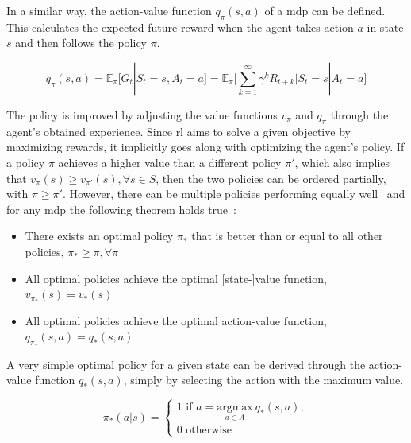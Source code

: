 \documentclass[draft,final]{vutinfth} %
\newcommand{\p}[1]{see p. #1}
\begin{document}
    In a similar way, the action-value function $q_\pi(s,a)$ of a \gls{mdp} can be defined.
    This calculates the expected future reward when the agent takes action $a$ in state $s$ and then follows the policy $\pi$.

    \begin{equation}
        q_\pi(s,a) = \mathbb{E}_\pi[G_t|S_t = s, A_t = a] = \mathbb{E}_\pi \Bigg[\sum_{k=1}^{\infty} \gamma^k R_{t+k} \bigg| S_t = s | A_t = a \Bigg]\label{eq:quality_function}
    \end{equation}

    The policy is improved by adjusting the value functions $v_\pi$ and $q_\pi$ through the agent's obtained experience.
    Since \gls{rl} aims to solve a given objective by maximizing rewards, it implicitly goes along with optimizing the agent's policy.
    If a policy $\pi$ achieves a higher value than a different policy $\pi'$, which also implies that $v_\pi(s) \geq v_{\pi'}(s), \forall s \in \mathit{S}$, then the two policies can be ordered partially, with $\pi \geq \pi'$.
    However, there can be multiple policies performing equally well~\citep{sutton_reinforcement_2018} and for any \gls{mdp} the following theorem holds true~\citep[\p{43}]{silver_lecture_2015-1}:

    \begin{itemize}
        \item There exists an optimal policy $\pi_*$ that is better than or equal to all other policies, $\pi_* \geq \pi, \forall\pi$
        \item All optimal policies achieve the optimal [state-]value function, $v_{\pi_*}(s) = v_*(s)$
        \item All optimal policies achieve the optimal action-value function, $q_{\pi_*}(s,a) = q_*(s,a)$
    \end{itemize}

    A very simple optimal policy for a given state can be derived through the action-value function $q_*(s,a)$, simply by selecting the action with the maximum value.

    \begin{equation}
        \pi_*(a|s) =
        \begin{cases}
            1 \text{ if } a =  \underset{a \in \mathit{A}}{\text{argmax}}\ q_*(s,a),\\
            0 \text{ otherwise }
        \end{cases}
    \end{equation}
\end{document}
